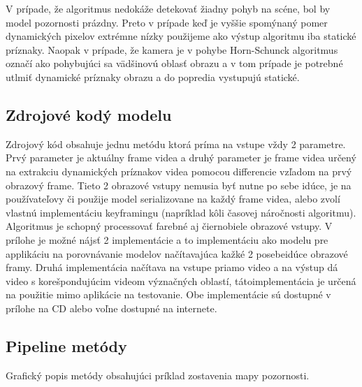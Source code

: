 V prípade, že algoritmus nedokáže detekovať žiadny pohyb na scéne, bol by model pozornosti prázdny.
Preto v prípade keď je vyššie spomýnaný pomer dynamických pixelov extrémne nízky použijeme ako výstup algoritmu iba statické príznaky.
Naopak v prípade, že kamera je v pohybe Horn-Schunck algoritmus označí ako pohybujúci sa vädšinovú oblasť obrazu a v tom prípade je potrebné utlmiť dynamické príznaky obrazu a do popredia vystupujú statické.

\subsection{Zdrojové kodý modelu}
Zdrojový kód obsahuje jednu metódu ktorá príma na vstupe vždy 2 parametre.
Prvý parameter je aktuálny frame videa a druhý parameter je frame videa určený na extrakciu dynamických príznakov videa pomocou differencie vzľadom na prvý obrazový frame.
Tieto 2 obrazové vstupy nemusia byť nutne po sebe idúce, je na používateľovy či použije model serializovane na každý frame videa, alebo zvolí vlastnú implementáciu keyframingu (napríklad kôli časovej náročnosti algoritmu).
Algoritmus je schopný processovať farebné aj čiernobiele obrazové vstupy.
V prílohe je možné nájsť 2 implementácie a to implementáciu ako modelu pre applikáciu na porovnávanie modelov načítavajúca kažké 2 posebeidúce obrazové framy.
Druhá implementácia načítava na vstupe priamo video a na výstup dá video s korešpondujúcim videom význačných oblastí, tátoimplementácia je určená na použitie mimo aplikácie na testovanie.
Obe implementácie sú dostupné v prílohe na CD alebo voľne dostupné na internete.

\clearpage

\subsection{Pipeline metódy}
  Grafický popis metódy obsahujúci príklad zostavenia mapy pozornosti.

